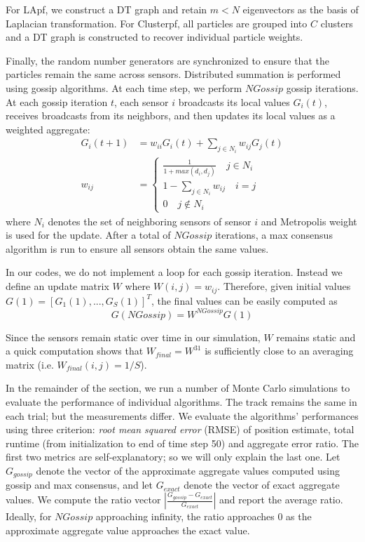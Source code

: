 \documentclass[10pt,letterpaper,final]{article}
\begin{document}
For LApf, we construct a DT graph and retain $m< N$ eigenvectors as the basis of Laplacian transformation. For Clusterpf, all particles are grouped into $C$ clusters and a DT graph is constructed to recover individual particle weights. 

Finally, the random number generators are synchronized to ensure that the particles remain the same across sensors. Distributed summation is performed using gossip algorithms. At each time step, we perform $NGossip$ gossip iterations. At each gossip iteration $t$, each sensor $i$ broadcasts its local values $G_i(t)$, receives broadcasts from its neighbors, and then updates its local values as a weighted aggregate:
\begin{align}
G_i(t+1) &= w_{ii}G_i(t) + \sum_{j\in N_i}w_{ij}G_j(t) \\
w_{ij} &=
\begin{cases}
\frac{1}{1+max(d_i, d_j)} \quad j\in N_i \\
1-\sum_{j\in N_i}w_{ij} \quad i=j \\
0 \quad j\notin N_i
\end{cases}
\label{eqn:metropolis_weight}
\end{align}
where $N_i$ denotes the set of neighboring sensors of sensor $i$ and Metropolis weight is used for the update. After a total of $NGossip$ iterations, a max consensus algorithm is run to ensure all sensors obtain the same values. 

In our codes, we do not implement a loop for each gossip iteration. Instead we define an update matrix $W$ where $W(i,j)=w_{ij}$. Therefore, given initial values $G(1)=[G_1(1),...,G_S(1)]^T$, the final values can be easily computed as 
\begin{equation}
G(NGossip) = W^{NGossip}G(1)
\end{equation}

Since the sensors remain static over time in our simulation, $W$ remains static and a quick computation shows that $W_{final}=W^{31}$ is sufficiently close to an averaging matrix (i.e. $W_{final}(i,j)=1/S$). 

In the remainder of the section, we run a number of Monte Carlo simulations to evaluate the performance of individual algorithms. The track remains the same in each trial; but the measurements differ. We evaluate the algorithms' performances using three criterion: \textit{root mean squared error} (RMSE) of position estimate, total runtime (from initialization to end of time step 50) and aggregate error ratio. The first two metrics are self-explanatory; so we will only explain the last one. Let $G_{gossip}$ denote the vector of the approximate aggregate values computed using gossip and max consensus, and let $G_{exact}$ denote the vector of exact aggregate values. We compute the ratio vector $|\frac{G_{gossip}-G_{exact}}{G_{exact}}|$ and report the average ratio. Ideally, for $NGossip$ approaching infinity, the ratio approaches 0 as the approximate aggregate value approaches the exact value. 
\end{document}
